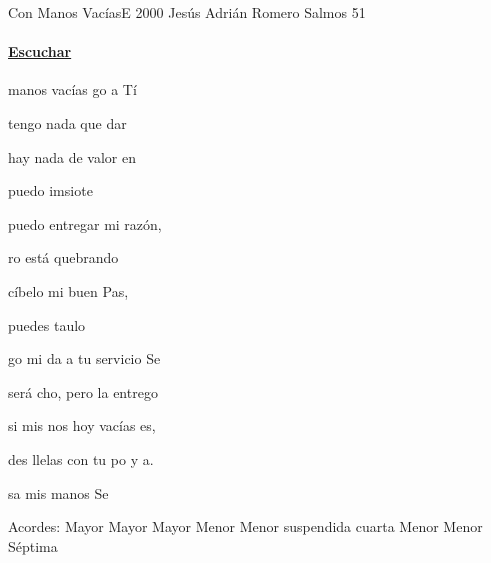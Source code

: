 \documentclass[12pt, spanish]{book}
\newcommand{\NotCCLIed}{\relax}
\begin{document}
    \begin{song}{Con Manos Vacías}{E}
        {2000} %
        {Jesús Adrián Romero}
        {Salmos 51} %
        {} %
        \ifChordBk
        \paragraph{\mbox{}\hfill\protect\href{https://open.spotify.com/intl-es/track/2vAYYOwfKVR3cCqg1mI6No}{Escuchar}\mbox{}\hfill}
        \fi

        \begin{SBOpGroup}
             manos vacías go a Tí

             tengo nada que dar

             hay nada de valor en 

             puedo imsiote
        \end{SBOpGroup}
        \vskip 20pt
        \begin{SBOpGroup}
             puedo entregar mi razón,

            ro está quebrando

            cíbelo mi buen Pas,

             puedes taulo
        \end{SBOpGroup}

        \begin{SBChorus}
            go mi da a tu servicio Se

             será cho, pero la entrego 

             si mis nos hoy vacías es,

            des llelas con tu  po y a.

            sa mis manos Se
        \end{SBChorus}

        \ifChordBk
        \begin{SBOpGroup}
            Acordes:\break
             Mayor \hfill
             Mayor \hfill\null\break
             Mayor \hfill
             Menor \hfill\null\break
             Menor \hfill
             suspendida cuarta \hfill\null\break
             Menor \hfill
             Menor S\'eptima \hfill
        \end{SBOpGroup}
        \fi


\end{song}
\end{document}

